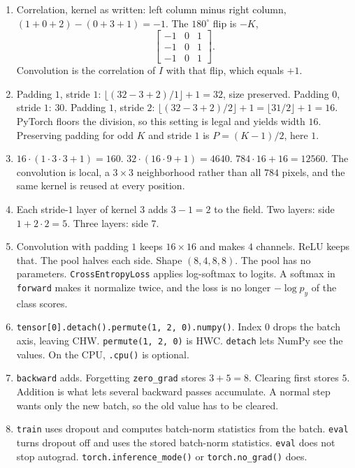 \documentclass[11pt]{article}
\begin{document}
\begin{enumerate}
\item Correlation, kernel as written: left column minus right column, $(1+0+2)-(0+3+1)=-1$. The $180^\circ$ flip is $-K$,
\[
\begin{bmatrix}-1&0&1\\ -1&0&1\\ -1&0&1\end{bmatrix}.
\]
Convolution is the correlation of $I$ with that flip, which equals $+1$.

\item Padding $1$, stride $1$: $\lfloor(32-3+2)/1\rfloor+1=32$, size preserved. Padding $0$, stride $1$: $30$. Padding $1$, stride $2$: $\lfloor(32-3+2)/2\rfloor+1=\lfloor 31/2\rfloor+1=16$. PyTorch floors the division, so this setting is legal and yields width $16$. Preserving padding for odd $K$ and stride $1$ is $P=(K-1)/2$, here $1$.

\item $16\cdot(1\cdot 3\cdot 3+1)=160$. $32\cdot(16\cdot 9+1)=4640$. $784\cdot 16+16=12560$. The convolution is local, a $3\times 3$ neighborhood rather than all $784$ pixels, and the same kernel is reused at every position.

\item Each stride-$1$ layer of kernel $3$ adds $3-1=2$ to the field. Two layers: side $1+2\cdot 2=5$. Three layers: side $7$.

\item Convolution with padding $1$ keeps $16\times 16$ and makes $4$ channels. ReLU keeps that. The pool halves each side. Shape $(8,4,8,8)$. The pool has no parameters. \texttt{CrossEntropyLoss} applies log-softmax to logits. A softmax in \texttt{forward} makes it normalize twice, and the loss is no longer $-\log p_y$ of the class scores.

\item \texttt{tensor[0].detach().permute(1, 2, 0).numpy()}. Index $0$ drops the batch axis, leaving CHW. \texttt{permute(1, 2, 0)} is HWC. \texttt{detach} lets NumPy see the values. On the CPU, \texttt{.cpu()} is optional.

\item \texttt{backward} adds. Forgetting \texttt{zero\_grad} stores $3+5=8$. Clearing first stores $5$. Addition is what lets several backward passes accumulate. A normal step wants only the new batch, so the old value has to be cleared.

\item \texttt{train} uses dropout and computes batch-norm statistics from the batch. \texttt{eval} turns dropout off and uses the stored batch-norm statistics. \texttt{eval} does not stop autograd. \texttt{torch.inference\_mode()} or \texttt{torch.no\_grad()} does.


\end{enumerate}
\end{document}
